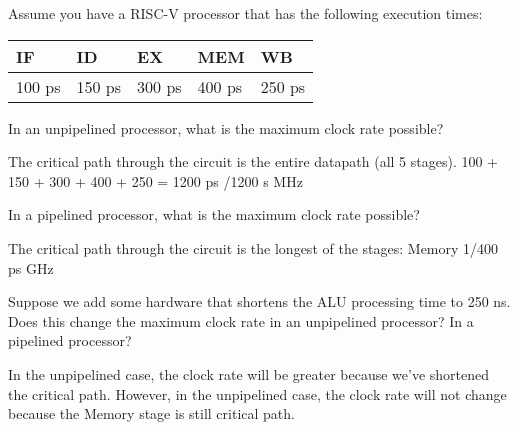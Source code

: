\begin{blocksection}
\question
Assume you have a RISC-V processor that has the following execution times:

\begin{tabular}{ |l|l|l|l|l| } 
 \hline
 IF & ID & EX & MEM & WB \\
 \hline
 100 ps & 150 ps & 300 ps & 400 ps & 250 ps \\
 \hline
\end{tabular}

\begin{parts}
\item In an unpipelined processor, what is the maximum clock rate possible?

\begin{solution}[0.5in]
The critical path through the circuit is the entire datapath (all 5 stages).
100 + 150 + 300 + 400 + 250 = 1200 ps /1200 s  MHz
\end{solution}

\item In a pipelined processor, what is the maximum clock rate possible?

\begin{solution}[0.5in]
The critical path through the circuit is the longest of the stages: Memory
1/400 ps  GHz
\end{solution}

\item Suppose we add some hardware that shortens the ALU processing time to 250 ns. Does this change the maximum clock rate in an unpipelined processor? In a pipelined processor?

\begin{solution}[0.5in]
In the unpipelined case, the clock rate will be greater because we’ve shortened the critical path. However, in the unpipelined case, the clock rate will not change because the Memory stage is still critical path.
\end{solution}

\end{parts}
\end{blocksection}